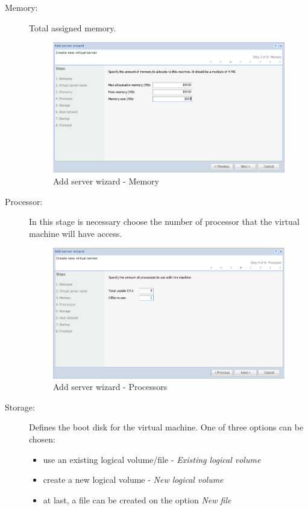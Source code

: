 \begin{description}
	\item[Memory:] Total assigned memory.
		\begin{figure}[H]
        		\begin{center}
		        \includegraphics[scale=0.5]{screenshots/server_createwiz_memory.png}
        		\caption{Add server wizard - Memory}
	        	\label{fig:server_createwiz_memory}
	        	\end{center}
		\end{figure}

	\item[Processor:] In this stage is necessary choose the number of processor that the virtual machine will have access.
		\begin{figure}[H]
        		\begin{center}
		        \includegraphics[scale=0.5]{screenshots/server_createwiz_processor.png}
        		\caption{Add server wizard - Processors}
		        \label{fig:server_createwiz_processor}
	        	\end{center}
		\end{figure}

	\item[Storage:] Defines the boot disk for the virtual machine. One of three options can be chosen:
\begin{itemize}
	\item use an existing logical volume/file - \emph{Existing logical volume}
	\item create a new logical volume - \emph{New logical volume}
	\item at last, a file can be created on the option \emph{New file}
\end{itemize}


\end{description}
